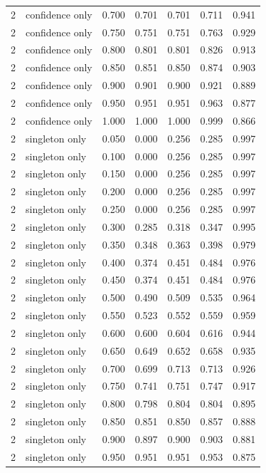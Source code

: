 \begin{tabular}{rlrrrrr}
2 & confidence only & 0.700 & 0.701 & 0.701 & 0.711 & 0.941 \\
2 & confidence only & 0.750 & 0.751 & 0.751 & 0.763 & 0.929 \\
2 & confidence only & 0.800 & 0.801 & 0.801 & 0.826 & 0.913 \\
2 & confidence only & 0.850 & 0.851 & 0.850 & 0.874 & 0.903 \\
2 & confidence only & 0.900 & 0.901 & 0.900 & 0.921 & 0.889 \\
2 & confidence only & 0.950 & 0.951 & 0.951 & 0.963 & 0.877 \\
2 & confidence only & 1.000 & 1.000 & 1.000 & 0.999 & 0.866 \\
2 & singleton only & 0.050 & 0.000 & 0.256 & 0.285 & 0.997 \\
2 & singleton only & 0.100 & 0.000 & 0.256 & 0.285 & 0.997 \\
2 & singleton only & 0.150 & 0.000 & 0.256 & 0.285 & 0.997 \\
2 & singleton only & 0.200 & 0.000 & 0.256 & 0.285 & 0.997 \\
2 & singleton only & 0.250 & 0.000 & 0.256 & 0.285 & 0.997 \\
2 & singleton only & 0.300 & 0.285 & 0.318 & 0.347 & 0.995 \\
2 & singleton only & 0.350 & 0.348 & 0.363 & 0.398 & 0.979 \\
2 & singleton only & 0.400 & 0.374 & 0.451 & 0.484 & 0.976 \\
2 & singleton only & 0.450 & 0.374 & 0.451 & 0.484 & 0.976 \\
2 & singleton only & 0.500 & 0.490 & 0.509 & 0.535 & 0.964 \\
2 & singleton only & 0.550 & 0.523 & 0.552 & 0.559 & 0.959 \\
2 & singleton only & 0.600 & 0.600 & 0.604 & 0.616 & 0.944 \\
2 & singleton only & 0.650 & 0.649 & 0.652 & 0.658 & 0.935 \\
2 & singleton only & 0.700 & 0.699 & 0.713 & 0.713 & 0.926 \\
2 & singleton only & 0.750 & 0.741 & 0.751 & 0.747 & 0.917 \\
2 & singleton only & 0.800 & 0.798 & 0.804 & 0.804 & 0.895 \\
2 & singleton only & 0.850 & 0.851 & 0.850 & 0.857 & 0.888 \\
2 & singleton only & 0.900 & 0.897 & 0.900 & 0.903 & 0.881 \\
2 & singleton only & 0.950 & 0.951 & 0.951 & 0.953 & 0.875 \\

\end{tabular}
